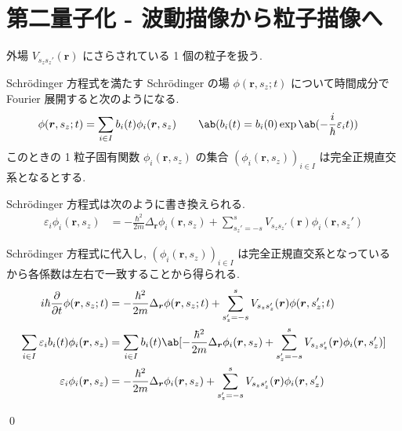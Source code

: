 \documentclass[uplatex,dvipdfmx,a4paper,11pt]{jlreq}
\makeatletter
\newcommand{\rr}{\bm{r}}
\numberwithin{equation}{section}
\theoremstyle{definition}
\renewenvironment{proof}[1][\proofname]{\par
  \normalfont
  \topsep6\p@\@plus6\p@ \trivlist
  \item[\hskip\labelsep{\bfseries #1}\@addpunct{\bfseries}]\ignorespaces\quad\par
}{
  \qed\endtrivlist\@endpefalse
}
\renewcommand\proofname{証明}
\makeatother
\begin{document}
\section{第二量子化 - 波動描像から粒子描像へ}
外場 $V_{s_zs_z'}(\rr)$ にさらされている 1 個の粒子を扱う.
\begin{definition}[Q21-102(ii)(iv)]
  Schrödinger 方程式を満たす Schrödinger の場 $\phi(\rr, s_z; t)$ について時間成分で Fourier 展開すると次のようになる.
  \begin{align}
    \phi(\rr, s_z; t) & = \sum_{i\in I}b_i(t)\phi_i(\rr, s_z) \qquad \ab(b_i(t) = b_i(0)\exp\ab(-\frac{i}{\hbar}\varepsilon_it))
  \end{align}
  このときの 1 粒子固有関数 $\phi_i(\rr, s_z)$ の集合 $(\phi_i(\rr, s_z))_{i\in I}$ は完全正規直交系となるとする.
\end{definition}
\begin{proposition}[Q21-102(i)(iii)]
  Schrödinger 方程式は次のように書き換えられる.
  \begin{align}
    \varepsilon_i\phi_i(\rr, s_z) & = -\frac{\hbar^2}{2m}\Delta_{\rr}\phi_i(\rr, s_z) + \sum_{s_z' = -s}^{s}V_{s_zs_z'}(\rr)\phi_i(\rr, s_z')
  \end{align}
\end{proposition}
\begin{proof}
  Schrödinger 方程式に代入し, $(\phi_i(\rr, s_z))_{i\in I}$ は完全正規直交系となっているから各係数は左右で一致することから得られる.
  \begin{align}
    i\hbar\diffp{}{t}\phi(\rr, s_z; t)               & = -\frac{\hbar^2}{2m}\Delta_{\rr}\phi(\rr, s_z; t) + \sum_{s_z' = -s}^{s}V_{s_zs_z'}(\rr)\phi(\rr, s_z'; t)                       \\
    \sum_{i\in I}\varepsilon_ib_i(t)\phi_i(\rr, s_z) & = \sum_{i\in I}b_i(t)\ab[-\frac{\hbar^2}{2m}\Delta_{\rr}\phi_i(\rr, s_z) + \sum_{s_z' = -s}^{s}V_{s_zs_z'}(\rr)\phi_i(\rr, s_z')] \\
    \varepsilon_i\phi_i(\rr, s_z)                    & = -\frac{\hbar^2}{2m}\Delta_{\rr}\phi_i(\rr, s_z) + \sum_{s_z' = -s}^{s}V_{s_zs_z'}(\rr)\phi_i(\rr, s_z')
  \end{align}
\end{proof}
\end{document}
